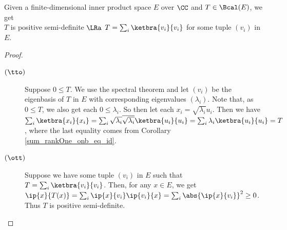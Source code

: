 \begin{lemma}\label{LinearMap.isPositive_iff_eq_sum_rankOne}\leanok
  Given a finite-dimensional inner product space $E$ over $\CC$ and $T\in\Bcal(E)$, we get\\
  \hspace*{0.5cm}$T$ is positive semi-definite $\LRa$ $T=\sum_i\ketbra{v_i}{v_i}$ for some tuple $(v_i)$ in $E$.
 \end{lemma}
 \begin{proof}\leanok {\ }
 \begin{description}
  \item[$(\tto)$]
   Suppose $0\leq{T}$. We use the spectral theorem and let $(v_i)$ be the eigenbasis of $T$ in $E$ with corresponding eigenvalues $(\lambda_i)$. Note that, as $0\leq{T}$, we also get each $0\leq\lambda_i$. So then let each $x_i=\sqrt{\lambda_i}u_i$. Then we have $\sum_i\ketbra{x_i}{x_i}=\sum_i\sqrt{\lambda_i}\overline{\sqrt{\lambda_i}}\ketbra{u_i}{u_i}=\sum_i\lambda_i\ketbra{u_i}{u_i}=T$, where the last equality comes from Corollary \ref{sum_rankOne_onb_eq_id}.
  \item[$(\ott)$]
   Suppose we have some tuple $(v_i)$ in $E$ such that $T=\sum_i\ketbra{v_i}{v_i}$. Then, for any $x\in{E}$, we get
   $\ip{x}{T(x)}=\sum_i\ip{x}{v_i}\ip{v_i}{x}=\sum_i\abs{\ip{x}{v_i}}^2\geq0$.
   Thus $T$ is positive semi-definite.
 \end{description}
 \end{proof}

